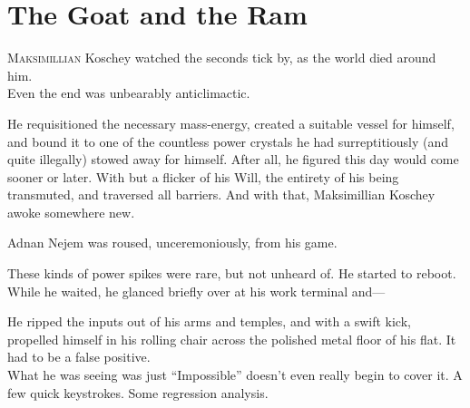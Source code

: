 \chapter{The Goat and the Ram}


\lettrine{M}{aksimillian} Koschey watched the seconds tick by, as the world died around him.\\Even the end was unbearably anticlimactic.

\SmallVSpace
He requisitioned the necessary mass-energy, created a suitable vessel for himself, and bound it to one of the countless power crystals he had surreptitiously (and quite illegally) stowed away for himself. After all, he figured this day would come sooner or later.
\SmallVSpace
With but a flicker of his Will, the entirety of his being transmuted, and traversed all barriers.
\SomeVSpace
And with that, Maksimillian Koschey awoke somewhere new.
\simpleline
{}

Adnan Nejem was roused, unceremoniously, from his game.

\SmallVSpace
These kinds of power spikes were rare, but not unheard of. He started to reboot. While he waited, he glanced briefly over at his work terminal and\mbox{---}

\SmallVSpace\par
He ripped the inputs out of his arms and temples, and with a swift kick, propelled himself in his rolling chair across the polished metal floor of his flat. It had to be a false positive.\\What he was seeing was just{\el} “Impossible” doesn’t even really begin to cover it.
\SmallVSpace
A few quick keystrokes. Some regression analysis.

